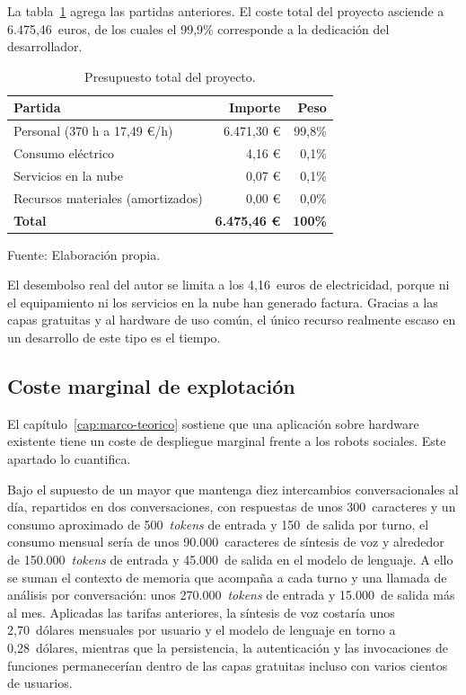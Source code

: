 La tabla~\ref{tab:presupuesto} agrega las partidas anteriores. El coste total del proyecto asciende a 6.475,46~euros, de los cuales el 99,9\% corresponde a la dedicación del desarrollador.

\begin{table}[htbp]
    \centering
    \caption{Presupuesto total del proyecto.}
    \label{tab:presupuesto}
    \begin{tabularx}{\textwidth}{@{}>{\RaggedRight\arraybackslash}X r r@{}}
        \toprule
        \textbf{Partida} & \textbf{Importe} & \textbf{Peso} \\
        \midrule
        Personal (370 h a 17,49 €/h)      & 6.471,30 € & 99,8\% \\
        Consumo eléctrico                 &     4,16 € &  0,1\% \\
        Servicios en la nube              &     0,07 € &  0,1\% \\
        Recursos materiales (amortizados) &     0,00 € &  0,0\% \\
        \midrule
        \textbf{Total}                    & \textbf{6.475,46 €} & \textbf{100\%} \\
        \bottomrule
    \end{tabularx}

    \vspace{2pt}
    {\footnotesize Fuente: Elaboración propia.}
\end{table}

El desembolso real del autor se limita a los 4,16~euros de electricidad, porque ni el equipamiento ni los servicios en la nube han generado factura. Gracias a las capas gratuitas y al hardware de uso común, el único recurso realmente escaso en un desarrollo de este tipo es el tiempo.

\subsection{Coste marginal de explotación}

El capítulo~\ref{cap:marco-teorico} sostiene que una aplicación sobre hardware existente tiene un coste de despliegue marginal frente a los robots sociales. Este apartado lo cuantifica.

Bajo el supuesto de un mayor que mantenga diez intercambios conversacionales al día, repartidos en dos conversaciones, con respuestas de unos 300~caracteres y un consumo aproximado de 500~\textit{tokens} de entrada y 150~de salida por turno, el consumo mensual sería de unos 90.000~caracteres de síntesis de voz y alrededor de 150.000~\textit{tokens} de entrada y 45.000~de salida en el modelo de lenguaje. A ello se suman el contexto de memoria que acompaña a cada turno y una llamada de análisis por conversación: unos 270.000~\textit{tokens} de entrada y 15.000~de salida más al mes. Aplicadas las tarifas anteriores, la síntesis de voz costaría unos 2,70~dólares mensuales por usuario y el modelo de lenguaje en torno a 0,28~dólares, mientras que la persistencia, la autenticación y las invocaciones de funciones permanecerían dentro de las capas gratuitas incluso con varios cientos de usuarios.

